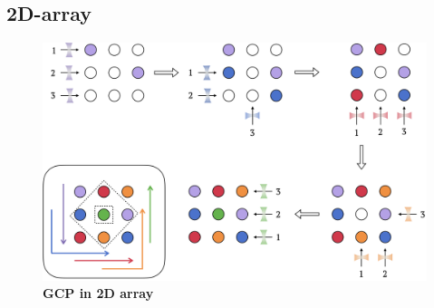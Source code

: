 \documentclass[%
 reprint,
nofootinbib,
 amsmath,amssymb,
 aps,
pra,
floatfix,
]{revtex4-2}
\begin{document}
\subsection{2D-array}
\begin{figure}[t!]
    \centering
    \includegraphics[width=13cm]{picture/GCP_2D.png}
    \caption{\textbf{GCP in 2D array} }
    \label{fig:case1_ultimate}
\end{figure}
\end{document}
